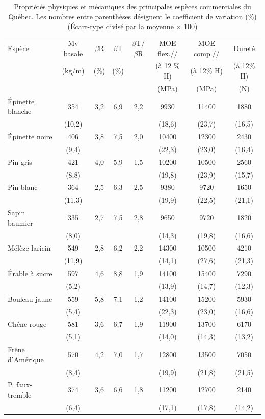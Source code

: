 \begin{table}[ht]
\centering
	\begin{tabular}{l c c c c c c c}
	\hline
Espèce	&	Mv basale	&	$\beta$R	&	$\beta$T	&	$\beta$T/$\beta$R	&	MOE flex.//	&	MOE comp.//	&	Dureté\\
&	(kg/m\up{3})	&	(\%)	&	(\%)	&		&	(à 12 \% H)	&	(à 12\% H)	&	(à 12\% H)\\
&		&		&		&		&	(MPa)	&	(MPa)	&	(N)\\
\hline
\hline
Épinette blanche	&	354	&	3,2	&	6,9	&	2,2	&	9930	&	11400	&	1880\\
&	(10,2)	&		&		&		&	(18,6)	&	(23,7)	&	(16,5)\\
Épinette noire	&	406	&	3,8	&	7,5	&	2,0	&	10400	&	12300	&	2430\\
&	(9,4)	&		&		&		&	(22,3)	&	(23,0)	&	(16,4)\\
Pin gris	&	421	&	4,0	&	5,9	&	1,5	&	10200	&	10500	&	2560\\
&	(8,8)	&		&		&		&	(19,8)	&	(23,9)	&	(15,7)\\
Pin blanc	&	364	&	2,5	&	6,3	&	2,5	&	9380	&	9720	&	1650\\
&	(11,3)	&		&		&		&	(19,9)	&	(22,5)	&	(21,1)\\
Sapin baumier	&	335	&	2,7	&	7,5	&	2,8	&	9650	&	9720	&	1820\\
&	(8,0)	&		&		&		&	(14,3)	&	(19,8)	&	(16,6)\\
Mélèze laricin	&	549	&	2,8	&	6,2	&	2,2	&	14300	&	10500	&	4210\\
&	(11,9)	&		&		&		&	(14,1)	&	(27,6)	&	(21,3)\\
\hline
Érable à sucre	&	597	&	4,6	&	8,8	&	1,9	&	14100	&	15400	&	7290\\
&	(5,2)	&		&		&		&	(13,9)	&	(14,7)	&	(12,3)\\
Bouleau jaune	&	559	&	5,8	&	7,1	&	1,2	&	14100	&	15200	&	5930\\
&	(5,4)	&		&		&		&	(22,3)	&	(23,0)	&	(16,6)\\
Chêne rouge	&	581	&	3,6	&	6,7	&	1,9	&	11900	&	13700	&	6170\\
&	(5,1)	&		&		&		&	(14,0)	&	(14,3)	&	(13,2)\\
Frêne d’Amérique	&	570	&	4,2	&	7,0	&	1,7	&	12800	&	13500	&	7050\\
&	(8,4)	&		&		&		&	(19,9)	&	(21,8)	&	(21,5)\\
P. faux-tremble	&	374	&	3,6	&	6,6	&	1,8	&	11200	&	12700	&	2140\\
&	(6,4)	&		&		&		&	(17,1)	&	(17,8)	&	(14,2)\\
	\hline
	\end{tabular}
\caption{Propriétés physiques et mécaniques des principales espèces commerciales du Québec. Les nombres entre parenthèses désignent le coefficient de variation (\%) (Écart-type divisé par la moyenne $\times$ 100)}
\label{tab:grostab}
\end{table}

